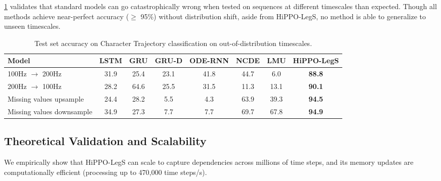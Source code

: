 \documentclass{article}
\begin{document}
\cref{tab:charactertrajectories} validates that standard models can go catastrophically wrong when tested on sequences at different timescales than expected.
Though all methods achieve near-perfect accuracy ($\geq$ 95\%) without distribution shift,
aside from HiPPO-LegS, no method is able to generalize to unseen timescales.




\begin{table}[ht]
    \small
    \centering
    \caption{Test set accuracy on Character Trajectory classification on out-of-distribution timescales.   }
    \begin{tabular}{lccccccc}
        \toprule
        Model                     & \textbf{LSTM} & \textbf{GRU} & \textbf{GRU-D} & \textbf{ODE-RNN} & \textbf{NCDE} & \textbf{LMU} & \textbf{HiPPO-LegS} \\
        \midrule
        100Hz $\to$ 200Hz         & 31.9          & 25.4         & 23.1           & 41.8             & 44.7          & 6.0          & \textbf{88.8}       \\
        200Hz $\to$ 100Hz         & 28.2          & 64.6         & 25.5           & 31.5             & 11.3          & 13.1         & \textbf{90.1}       \\
        \midrule
        Missing values upsample   & 24.4          & 28.2         & 5.5            & 4.3              & 63.9          & 39.3         & \textbf{94.5}       \\
        Missing values downsample & 34.9          & 27.3         & 7.7            & 7.7              & 69.7          & 67.8         & \textbf{94.9}       \\
        \bottomrule
    \end{tabular}
    \label{tab:charactertrajectories}
\end{table}




\subsection{Theoretical Validation and Scalability}
\label{subsec:exp-scalability}

We empirically show that HiPPO-LegS can scale to capture dependencies
across millions of time steps, and its memory updates are computationally
efficient (processing up to 470,000 time steps/s).
\end{document}
